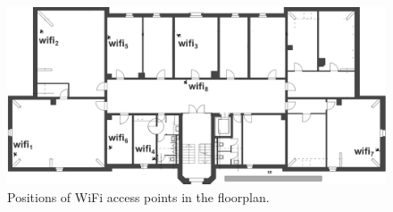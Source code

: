 \begin{figure}[th]
\centering
\includegraphics[width=1.0\textwidth]{Figures/wifi_access}
\decoRule
\caption[WiFi Access Points]{Positions of WiFi access points in the floorplan.}
\label{fig:wifi_accessAppendix}
\end{figure}
